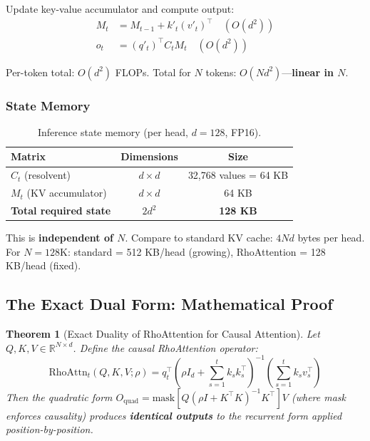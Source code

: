 \documentclass[11pt,a4paper]{article}
\newtheorem{theorem}{Theorem}[section]
\theoremstyle{remark}
\begin{document}
Update key-value accumulator and compute output:
\begin{align}
M_t &= M_{t-1} + k'_t (v'_t)^\top \quad (O(d^2)) \\
o_t &= (q'_t)^\top C_t M_t \quad (O(d^2))
\end{align}

Per-token total: $O(d^2)$ FLOPs. Total for $N$ tokens: $O(Nd^2)$---\textbf{linear in $N$}.

\subsubsection{State Memory}
\begin{table}[h]
\centering
\caption{Inference state memory (per head, $d=128$, FP16).}
\begin{tabular}{lcc}
\toprule
\textbf{Matrix} & \textbf{Dimensions} & \textbf{Size} \\
\midrule
$C_t$ (resolvent) & $d \times d$ & 32,768 values = 64 KB \\
$M_t$ (KV accumulator) & $d \times d$ & 64 KB \\
\midrule
\textbf{Total required state} & $2d^2$ & \textbf{128 KB} \\
\bottomrule
\end{tabular}
\end{table}

This is \textbf{independent of $N$}. Compare to standard KV cache: $4Nd$ bytes per head. For $N = 128\text{K}$: standard = 512 KB/head (growing), RhoAttention = 128 KB/head (fixed).

\subsection{The Exact Dual Form: Mathematical Proof}

\begin{theorem}[Exact Duality of RhoAttention for Causal Attention]
\label{thm:duality}
Let $Q, K, V \in \mathbb{R}^{N \times d}$. Define the causal RhoAttention operator:
\begin{equation}
\text{RhoAttn}_t(Q, K, V; \rho) = q_t^\top \left(\rho I_d + \sum_{s=1}^t k_s k_s^\top\right)^{-1} \left(\sum_{s=1}^t k_s v_s^\top\right)
\end{equation}
Then the quadratic form $O_{\text{quad}} = \text{mask}[Q (\rho I + K^\top K)^{-1} K^\top] V$ (where mask enforces causality) produces \textbf{identical outputs} to the recurrent form applied position-by-position.
\end{theorem}
\end{document}
